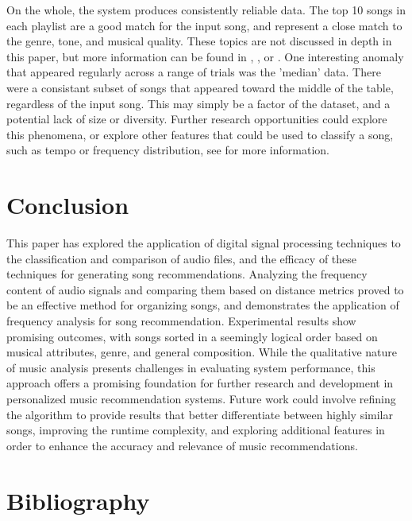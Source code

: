 \documentclass[conference]{IEEEtran}
\begin{document}
On the whole, the system produces consistently reliable data. The top 10 songs in each playlist are a good match for the input song, and represent a close match to the genre, tone, and musical quality. These topics are not discussed in depth in this paper, but more information can be found in \cite{gothamOPENMUSICTHEORY2021}, \cite{hongdanIntelligentMusicGenre2022}, or \cite{silverGenreComplexesPopular2016}. One interesting anomaly that appeared regularly across a range of trials was the 'median' data. There were a consistant subset of songs that appeared toward the middle of the table, regardless of the input song. This may simply be a factor of the dataset, and a potential lack of size or diversity. Further research opportunities could explore this phenomena, or explore other features that could be used to classify a song, such as tempo or frequency distribution, see \cite{mengMusicGenreClassification} for more information.

\section{Conclusion}
This paper has explored the application of digital signal processing techniques to the classification and comparison of audio files, and the efficacy of these techniques for generating song recommendations. Analyzing the frequency content of audio signals and comparing them based on distance metrics proved to be an effective method for organizing songs, and demonstrates the application of frequency analysis for song recommendation. Experimental results show promising outcomes, with songs sorted in a seemingly logical order based on musical attributes, genre, and general composition. While the qualitative nature of music analysis presents challenges in evaluating system performance, this approach offers a promising foundation for further research and development in personalized music recommendation systems. Future work could involve refining the algorithm to provide results that better differentiate between highly similar songs, improving the runtime complexity, and exploring additional features in order to enhance the accuracy and relevance of music recommendations.

\section{Bibliography}


\end{document}
